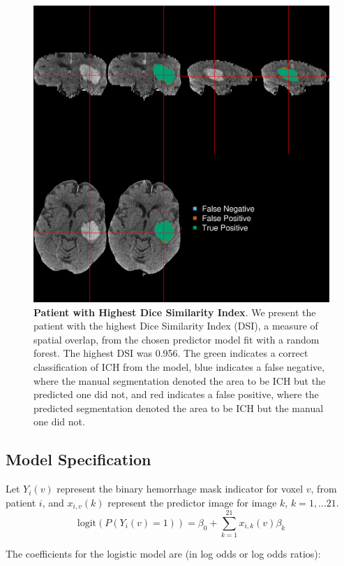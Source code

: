 \documentclass{elsarticle_nonatbib}\usepackage[]{graphicx}\usepackage[]{color}
\begin{document}
 \begin{figure}
\centering
\includegraphics[width=0.75\linewidth,keepaspectratio]{Reseg_Figure_DSI_Quantile_100_native.png}
\caption{{\bf Patient with  Highest Dice Similarity Index}. We present the patient with the highest Dice Similarity Index (DSI), a measure of spatial overlap, from the chosen predictor model fit with a random forest.  The highest DSI was 0.956. The green indicates a correct classification of ICH from the model, blue indicates a false negative, where the manual segmentation denoted the area to be ICH but the predicted one did not, and red indicates a false positive, where the predicted segmentation denoted the area to be ICH but the manual one did not. }
\label{fig:dice_img0}
\end{figure}




\subsection{Model Specification}


Let $Y_{i}(v)$ represent the binary hemorrhage mask indicator for voxel $v$, from patient $i$, and $x_{i,v}(k)$ represent the predictor image for image $k$, $k = 1, \dots 21$.
$$
\text{logit}\left(P(Y_{i}(v) = 1)\right) = \beta_0 + \sum_{k = 1}^{21} x_{i, k}(v)\beta_{k}
$$

The coefficients for the logistic model are (in log odds or log odds ratios):
\end{document}
